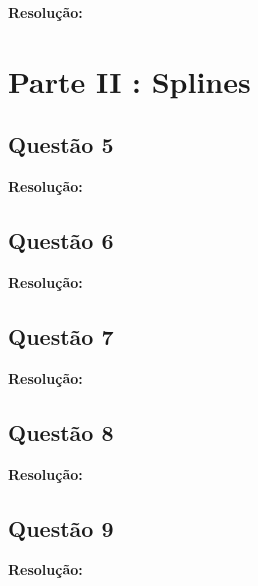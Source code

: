 \documentclass[12pt]{article}
\begin{document}
\textbf{Resolução:}

\section{Parte II : Splines}
\label{sec:parte2}

\subsection{Questão 5}
\label{subsec:p2q5}

\textbf{Resolução:}

\subsection{Questão 6}
\label{subsec:p2q6}

\textbf{Resolução:}

\subsection{Questão 7}
\label{subsec:p2q7}

\textbf{Resolução:}

\subsection{Questão 8}
\label{subsec:p2q8}

\textbf{Resolução:}

\subsection{Questão 9}
\label{subsec:p2q9}

\textbf{Resolução:}
\end{document}
